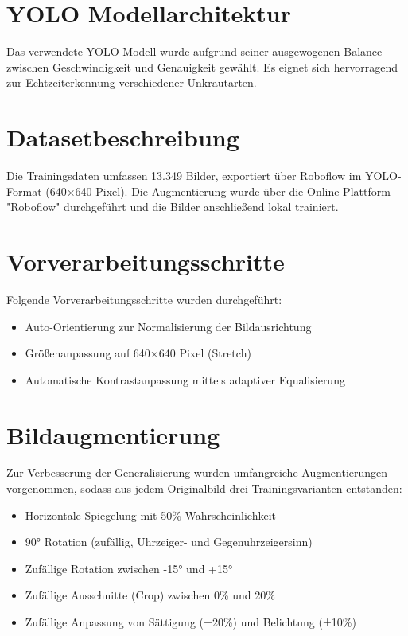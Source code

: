 \documentclass[12pt, a4paper]{scrreprt}
\begin{document}
\section{YOLO Modellarchitektur}
Das verwendete YOLO-Modell wurde aufgrund seiner ausgewogenen Balance zwischen Geschwindigkeit und Genauigkeit gewählt. Es eignet sich hervorragend zur Echtzeiterkennung verschiedener Unkrautarten.

\section{Datasetbeschreibung}
Die Trainingsdaten umfassen 13.349 Bilder, exportiert über Roboflow im YOLO-Format (640×640 Pixel). Die Augmentierung wurde über die Online-Plattform "Roboflow" durchgeführt und die Bilder anschließend lokal trainiert.

\section{Vorverarbeitungsschritte}
Folgende Vorverarbeitungsschritte wurden durchgeführt:
\begin{itemize}
    \item Auto-Orientierung zur Normalisierung der Bildausrichtung
    \item Größenanpassung auf 640×640 Pixel (Stretch)
    \item Automatische Kontrastanpassung mittels adaptiver Equalisierung
\end{itemize}

\section{Bildaugmentierung}
Zur Verbesserung der Generalisierung wurden umfangreiche Augmentierungen vorgenommen, sodass aus jedem Originalbild drei Trainingsvarianten entstanden:
\begin{itemize}
    \item Horizontale Spiegelung mit 50\% Wahrscheinlichkeit
    \item 90° Rotation (zufällig, Uhrzeiger- und Gegenuhrzeigersinn)
    \item Zufällige Rotation zwischen -15° und +15°
    \item Zufällige Ausschnitte (Crop) zwischen 0\% und 20\%
    \item Zufällige Anpassung von Sättigung (±20\%) und Belichtung (±10\%)
\end{itemize}
\end{document}
